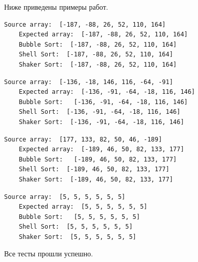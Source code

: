 \documentclass[a4paper]{article}
\begin{document}
	Ниже приведены примеры работ.
	
	\begin{lstlisting}[label = ex1, caption = Пример работы алгоритмов на сортированный массив]
	Source array:  [-187, -88, 26, 52, 110, 164]
	Expected array:  [-187, -88, 26, 52, 110, 164]
	Bubble Sort:  [-187, -88, 26, 52, 110, 164]
	Shell Sort:  [-187, -88, 26, 52, 110, 164]
	Shaker Sort:  [-187, -88, 26, 52, 110, 164]
	\end{lstlisting}
	
	
	
	\begin{lstlisting}[label = ex2, caption = Пример работы алгоритмов на случайный массив]
	Source array:  [-136, -18, 146, 116, -64, -91]
	Expected array:  [-136, -91, -64, -18, 116, 146]
	Bubble Sort:   [-136, -91, -64, -18, 116, 146]
	Shell Sort:  [-136, -91, -64, -18, 116, 146]
	Shaker Sort:  [-136, -91, -64, -18, 116, 146]
	\end{lstlisting}



	\begin{lstlisting}[label = ex3, caption = Пример работы алгоритмов на обратно отсортированный массив]
	Source array:  [177, 133, 82, 50, 46, -189]
	Expected array:  [-189, 46, 50, 82, 133, 177]
	Bubble Sort:   [-189, 46, 50, 82, 133, 177]
	Shell Sort:  [-189, 46, 50, 82, 133, 177]
	Shaker Sort:  [-189, 46, 50, 82, 133, 177]
	\end{lstlisting}



	\begin{lstlisting}[label = ex4, caption = Пример работы алгоритмов массив с одинаковыми элементами]
	Source array:  [5, 5, 5, 5, 5, 5]
	Expected array:  [5, 5, 5, 5, 5, 5]
	Bubble Sort:   [5, 5, 5, 5, 5, 5]
	Shell Sort:  [5, 5, 5, 5, 5, 5]
	Shaker Sort:  [5, 5, 5, 5, 5, 5]
	\end{lstlisting}

	Все тесты прошли успешно.
	\clearpage
	
\end{document}
